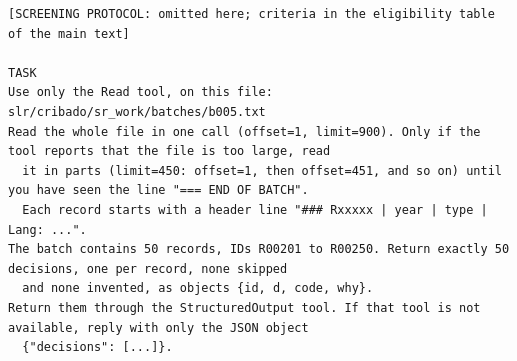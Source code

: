 \begin{lstlisting}
[SCREENING PROTOCOL: omitted here; criteria in the eligibility table of the main text]

TASK
Use only the Read tool, on this file: slr/cribado/sr_work/batches/b005.txt
Read the whole file in one call (offset=1, limit=900). Only if the tool reports that the file is too large, read
  it in parts (limit=450: offset=1, then offset=451, and so on) until you have seen the line "=== END OF BATCH".
  Each record starts with a header line "### Rxxxxx | year | type | Lang: ...".
The batch contains 50 records, IDs R00201 to R00250. Return exactly 50 decisions, one per record, none skipped
  and none invented, as objects {id, d, code, why}.
Return them through the StructuredOutput tool. If that tool is not available, reply with only the JSON object
  {"decisions": [...]}.
\end{lstlisting}

